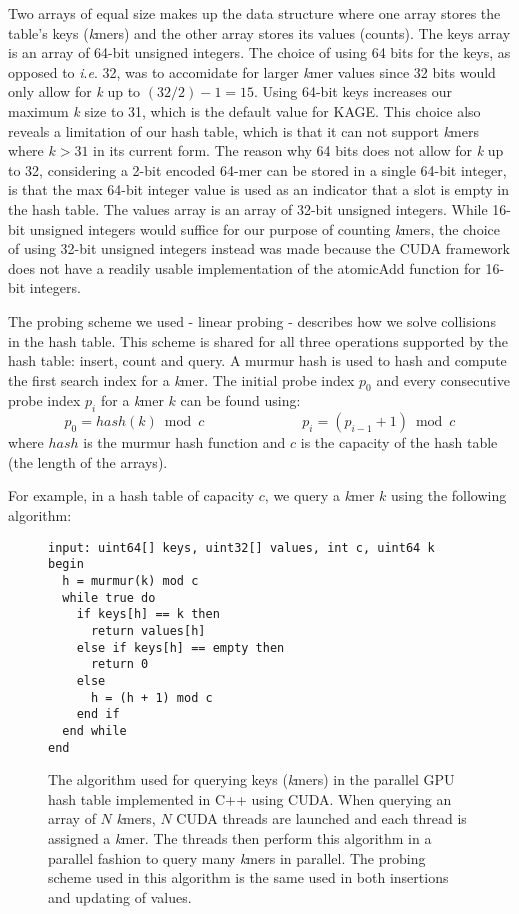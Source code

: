 Two arrays of equal size makes up the data structure where one array stores the table's keys (\textit{k}mers) and the other array stores its values (counts).
The keys array is an array of 64-bit unsigned integers.
The choice of using 64 bits for the keys, as opposed to \textit{i}.\textit{e}. 32, was to accomidate for larger \textit{k}mer values since 32 bits would only allow for \textit{k} up to $(32/2)-1=15$.
Using 64-bit keys increases our maximum \textit{k} size to 31, which is the default value for KAGE.
This choice also reveals a limitation of our hash table, which is that it can not support \textit{k}mers where $k>31$ in its current form.
The reason why 64 bits does not allow for \textit{k} up to 32, considering a 2-bit encoded 64-mer can be stored in a single 64-bit integer, is that the max 64-bit integer value is used as an indicator that a slot is empty in the hash table.
The values array is an array of 32-bit unsigned integers.
While 16-bit unsigned integers would suffice for our purpose of counting \textit{k}mers, the choice of using 32-bit unsigned integers instead was made because the CUDA framework does not have a readily usable implementation of the atomicAdd function for 16-bit integers.

The probing scheme we used - linear probing - describes how we solve collisions in the hash table. 
This scheme is shared for all three operations supported by the hash table: insert, count and query.
A murmur hash \cite{murmur} is used to hash and compute the first search index for a \textit{k}mer.
The initial probe index $p_0$ and every consecutive probe index $p_i$ for a \textit{k}mer $k$ can be found using:
\begin{equation}
  p_0=hash(k) \bmod c \hspace{7em} p_{i}=(p_{i-1}+1) \bmod c
\end{equation}
where $hash$ is the murmur hash function and $c$ is the capacity of the hash table (the length of the arrays).

For example, in a hash table of capacity $c$, we query a \textit{k}mer $k$ using the following algorithm:
\begin{figure}[H]
\begin{lstlisting}[style=pseudocode]
input: uint64[] keys, uint32[] values, int c, uint64 k
begin
  h = murmur(k) mod c
  while true do
    if keys[h] == k then
      return values[h]
    else if keys[h] == empty then
      return 0
    else
      h = (h + 1) mod c
    end if
  end while
end
\end{lstlisting}
\caption{
  The algorithm used for querying keys (\textit{k}mers) in the parallel GPU hash table implemented in C++ using CUDA. 
  When querying an array of $N$ \textit{k}mers, $N$ CUDA threads are launched and each thread is assigned a \textit{k}mer. 
  The threads then perform this algorithm in a parallel fashion to query many \textit{k}mers in parallel.
  The probing scheme used in this algorithm is the same used in both insertions and updating of values.
}
\end{figure}

